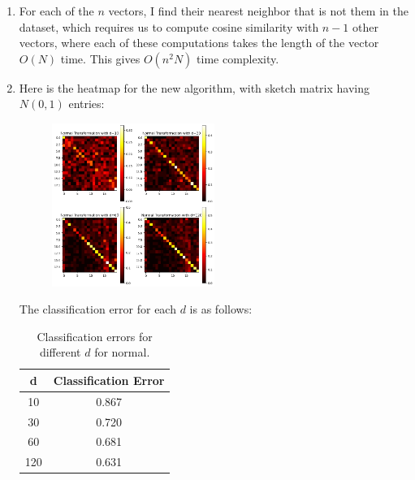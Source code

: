 \documentclass[12pt]{article}
\theoremstyle{definitionstyle}
\begin{document}
\begin{enumerate}[leftmargin=\labelsep]
\begin{enumerate}
            \item For each of the $n$ vectors, I find their nearest neighbor that is not them in the dataset, which requires us to compute cosine similarity with $n-1$ other vectors, where each of these computations takes the length of the vector $O(N)$ time. This gives $O(n^2N)$ time complexity.

            \item Here is the heatmap for the new algorithm, with sketch matrix having $N(0,1)$ entries:
            \begin{figure}[H]
                \centering
                \includegraphics[width=0.5\textwidth]{normal_heatmaps.png}
            \end{figure}
            The classification error for each $d$ is as follows:
            
            \begin{table}[H]
                \centering
                \begin{tabular}{|c|c|}
                    \hline
                    \textbf{d} & \textbf{Classification Error} \\ \hline
                    10         & 0.867                         \\ \hline
                    30         & 0.720                         \\ \hline
                    60         & 0.681                         \\ \hline
                    120        & 0.631                         \\ \hline
                \end{tabular}
                \caption{Classification errors for different \( d \) for normal.}
                \label{tab:classification_errors}
            \end{table}


\end{enumerate}
\end{enumerate}
\end{document}
